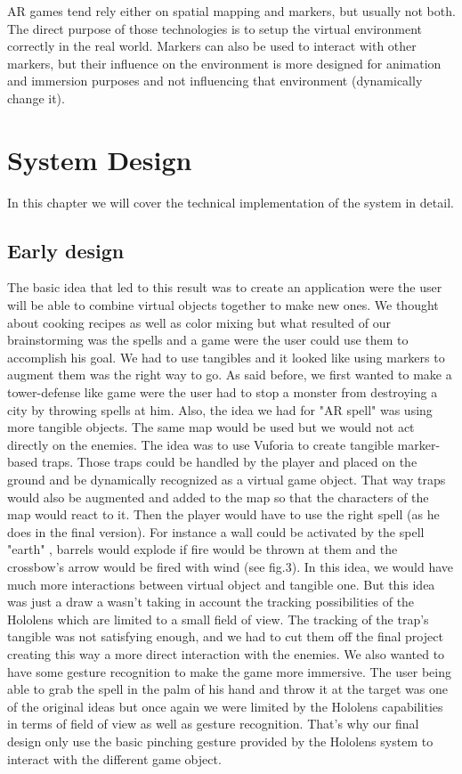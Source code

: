 \documentclass[sigchi, authorversion, screen]{acmart}
\begin{document}
AR games tend rely either on spatial mapping and markers, but usually not both. The direct purpose of those technologies is to setup the virtual environment correctly in the real world. Markers can also be used to interact with other markers, but their influence on the environment is more designed for animation and immersion purposes and not influencing that environment (dynamically change it).


\section{System Design}

In this chapter we will cover the technical implementation of the system in detail.

\subsection{Early design}
The basic idea that led to this result was to create an application were the user will be able to combine virtual objects together to make new ones. We thought about cooking recipes as well as color mixing but what resulted of our brainstorming was the spells and a game were the user could use them to accomplish his goal. We had to use tangibles and it looked like using markers to augment them was the right way to go. As said before, we first wanted to make a tower-defense like game were the user had to stop a monster from destroying a city by throwing spells at him. Also, the idea we had for "AR spell" was using more tangible objects. The same map would be used but we would not act directly on the enemies. The idea was to use Vuforia \cite{vuforia} to create tangible marker-based traps. Those traps could be handled by the player and placed on the ground and be dynamically recognized as a virtual game object. That way traps would also be augmented and added to the map so that the characters of the map would react to it. Then the player would have to use the right spell (as he does in the final version). For instance a wall could be activated by the spell "earth" , barrels would explode if fire would be thrown at them and the crossbow’s arrow would be fired with wind (see fig.3). In this idea, we would have much more interactions between virtual object and tangible one. But this idea was just a draw a wasn’t taking in account the tracking possibilities of the Hololens which are limited to a small field of view. The tracking of the trap’s tangible was not satisfying enough, and we had to cut them off the final project creating this way a more direct interaction with the enemies. We also wanted to have some gesture recognition to make the game more immersive. The user being able to grab the spell in the palm of his hand and throw it at the target was one of the original ideas but once again we were limited by the Hololens capabilities in terms of field of view as well as gesture recognition. That’s why our final design only use the basic pinching gesture provided by the Hololens system to interact with the different game object.
\end{document}
